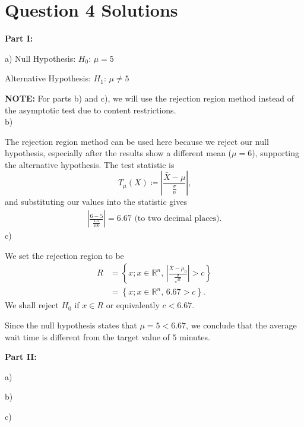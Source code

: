 \documentclass{article}
\begin{document}
\section*{Question 4 Solutions} %
\textbf{Part I:}

a)
Null Hypothesis: $H_0\mbox{: }\mu = 5$

Alternative Hypothesis: $H_1\mbox{: }\mu \neq 5$

\textbf{NOTE:} For parts b) and c), we will use the rejection region method instead of the asymptotic test due to content restrictions.\\
b)

The rejection region method can be used here because we reject our null hypothesis, especially after the results show a different mean ($\mu = 6$), supporting the alternative hypothesis. The test statistic is
\[T_{\mu}(X)\coloneqq \left|\frac{\bar{X}-\mu}{\frac{\sigma}{n}}\right|\mbox{,}\]
\hspace*{6mm}and substituting our values into the statistic gives
\begin{align*}
    \left|\frac{6 - 5}{\frac{1.5}{100}}\right| = 6.67\mbox{ (to two decimal places).}
\end{align*}
c)

We set the rejection region to be
\begin{align*}
    R &= \left\{x; x\in\mathbb{R}^n\mbox{, }\left|\frac{\bar{X} - \mu_0}{\frac{\sigma}{\sqrt{n}}}\right| > c\right\}\\
    &= \left\{x; x\in\mathbb{R}^n\mbox{, }6.67 > c\right\}\mbox{.}
\end{align*}
We shall reject $H_0$ if $x\in R$ or equivalently $c < 6.67$.

Since the null hypothesis states that $\mu = 5 < 6.67$, we conclude that the average wait time is different from the target value of $5$ minutes.

\textbf{Part II:}

a)

b)

c)
\end{document}
